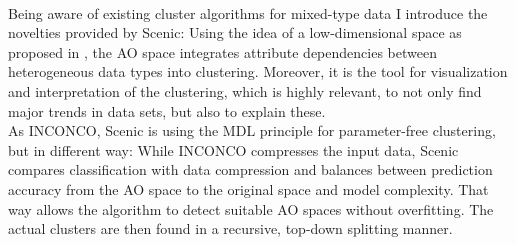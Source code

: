 \documentclass[conference]{IEEEtran}
\begin{document}
\\
Being aware of existing cluster algorithms for mixed-type data I introduce the novelties provided by Scenic: Using the idea of a low-dimensional space as proposed in \cite{gliffy}, the AO space integrates attribute dependencies between heterogeneous data types into clustering. Moreover, it is the tool for visualization and interpretation of the clustering, which is highly relevant, to not only find major trends in data sets, but also to explain these.
\\
As INCONCO, Scenic is using the MDL principle for parameter-free clustering, but in different way: While INCONCO compresses the input data, Scenic compares classification with data compression and balances between prediction accuracy from the AO space to the original space and model complexity. That way allows the algorithm to detect suitable AO spaces without overfitting. The actual clusters are then found in a recursive, top-down splitting manner.
\end{document}
